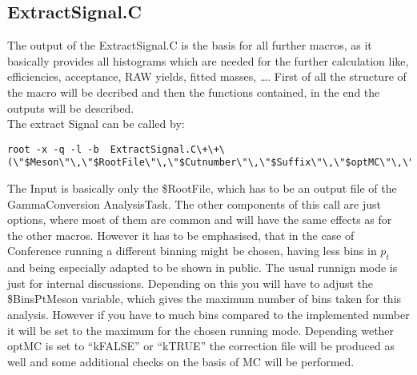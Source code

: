 		\subsection{ExtractSignal.C}
		The output of the ExtractSignal.C is the basis for all further macros, as it basically provides all histograms which are needed for the further calculation like, efficiencies, acceptance, RAW yields, fitted masses, \ldots. First of all the structure of the macro will be decribed and then the functions contained, in the end the outputs will be described.\\
		The extract Signal can be called by:
		\begin{lstlisting}
root -x -q -l -b  ExtractSignal.C\+\+\(\"$Meson\"\,\"$RootFile\"\,\"$Cutnumber\"\,\"$Suffix\"\,\"$optMC\"\,\"$optEn\"\,\"$optFit\"\,\"$optConf\"\,\"$optMult\"\,$BinsPtMeson\)               
		\end{lstlisting}
		The Input is basically only the \$RootFile, which has to be an output file of the GammaConversion AnalysisTask. The other components of this call are just options, where most of them are common and will have the same effects as for the other macros. However it has to be emphasised, that in the case of Conference running a different binning might be chosen, having less bins in $p_t$ and being especially adapted to be shown in public. The usual runnign mode is just for internal discussions. Depending on this you will have to adjust the \$BinsPtMeson variable, which gives the maximum number of bins taken for this analysis. However if you have to much bins compared to the implemented number it will be set to the maximum for the chosen running mode. Depending wether optMC is set to ``kFALSE'' or ``kTRUE'' the correction file will be produced as well and some additional checks on the basis of MC will be performed. \\

